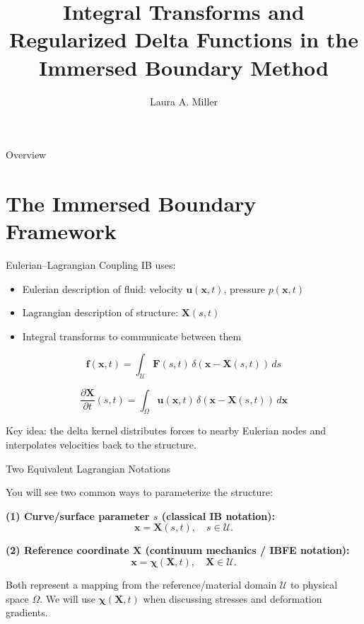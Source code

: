 \documentclass{beamer}
\title[Integral Transforms in IBAMR]{Integral Transforms and Regularized Delta Functions in the Immersed Boundary Method}
\author{Laura A. Miller}
\date{}
\begin{document}
\begin{frame}
\titlepage
\end{frame}

\begin{frame}{Overview}
\tableofcontents
\end{frame}

\section{The Immersed Boundary Framework}

\begin{frame}{Eulerian--Lagrangian Coupling}
IB uses:
\begin{itemize}
    \item Eulerian description of fluid: velocity $\mathbf{u}(\mathbf{x},t)$, pressure $p(\mathbf{x},t)$
    \item Lagrangian description of structure: $\mathbf{X}(s,t)$
    \item Integral transforms to communicate between them
\end{itemize}

\[
\mathbf{f}(\mathbf{x},t)
=
\int_{\mathcal{U}} \mathbf{F}(s,t)\,\delta(\mathbf{x}-\mathbf{X}(s,t))\,ds
\]

\[
\frac{\partial \mathbf{X}}{\partial t}(s,t)
=
\int_\Omega \mathbf{u}(\mathbf{x},t)\,\delta(\mathbf{x}-\mathbf{X}(s,t))\,d\mathbf{x}
\]

Key idea: the delta kernel distributes forces to nearby Eulerian nodes and interpolates velocities back to the structure.
\end{frame}

\begin{frame}{Two Equivalent Lagrangian Notations}
\small

You will see two common ways to parameterize the structure:

\medskip
\textbf{(1) Curve/surface parameter $s$ (classical IB notation):}
\[
\mathbf{x}=\mathbf{X}(s,t),
\quad s\in\mathcal{U}.
\]

\textbf{(2) Reference coordinate $\mathbf{X}$ (continuum mechanics / IBFE notation):}
\[
\mathbf{x}=\boldsymbol{\chi}(\mathbf{X},t),
\quad \mathbf{X}\in\mathcal{U}.
\]

\medskip
Both represent a mapping from the reference/material domain $\mathcal{U}$ to physical space $\Omega$.
We will use $\boldsymbol{\chi}(\mathbf{X},t)$ when discussing stresses and deformation gradients.

\end{frame}
\end{document}
